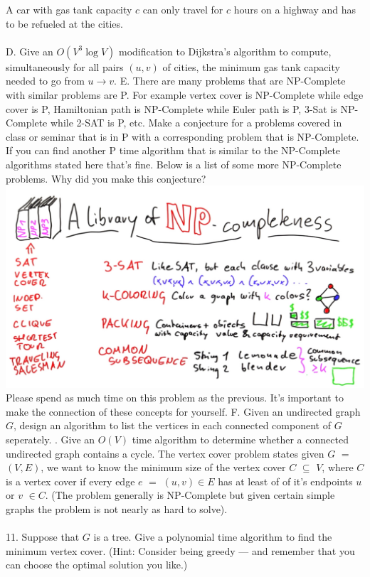 \documentclass[12pt]{article}
\begin{document}
A car with gas tank capacity $c$ can only travel for $c$ hours on a highway and has to be refueled at the cities.\\\\
D. Give an $O(V^3\log{V})$ modification to Dijkstra’s algorithm to compute, simultaneously for all pairs $(u,v)$ of cities, the minimum gas tank capacity needed to go from $u \rightarrow v$.
\newpage
\noindent E. There are many problems that are NP-Complete with similar problems are P. 
For example vertex cover is NP-Complete while edge cover is P, Hamiltonian path is NP-Complete 
while Euler path is P, 3-Sat is NP-Complete while 2-SAT is P, etc. Make a conjecture for a 
problems covered in class or seminar that is in P with a corresponding problem that is NP-Complete. If you can find 
another P time algorithm that is similar to the NP-Complete algorithms stated here that's 
fine. Below is a list of some more NP-Complete problems. Why did you make this conjecture?\\
\includegraphics[width=\textwidth]{npcomplete.jpg}\\ 
Please spend as much time on this problem as the previous. It's important to make the connection 
of these concepts for yourself.
\newpage
\noindent F. Given an undirected graph $G$, design an algorithm to list the vertices in each connected component of $G$ seperately.
\newpage
{}. Give an $O(V)$ time algorithm to determine whether a connected undirected graph contains a cycle.
\newpage 
\noindent The vertex cover problem states given $G$ $=$ $(V,E)$, we 
want to know the minimum size of the vertex cover $C$ $\subseteq$ $V$, where $C$ is a vertex cover if every 
edge $e$ $=$ $(u,v)\in E$ has at least of of it's endpoints $u$ or $v$ $\in C$.
(The problem generally is NP-Complete but given certain simple graphs the problem is not nearly as hard to solve).\\\\
11. Suppose that $G$ is a tree. Give a polynomial time algorithm to find the
minimum vertex cover. (Hint: Consider being greedy — and remember that you
can choose the optimal solution you like.)
\newpage
\end{document}
